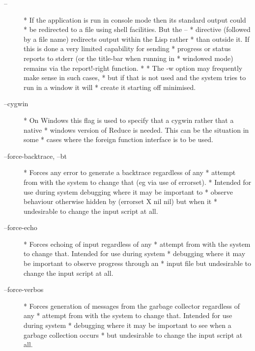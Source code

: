 \documentclass[a4paper,11pt]{article}
\begin{document}
\begin{description}

\item [{\ttfamily --}] \index{{\ttfamily --}}
          * If the application is run in console mode then its standard output could
          * be redirected to a file using shell facilities. But the {\ttfamily --}
          * directive (followed by a file name) redirects output within the Lisp rather
          * than outside it. If this is done a very limited capability for sending
          * progress or status reports to stderr (or the title-bar when running in
          * windowed  mode) remains via the {\ttfamily report!-right} function.
          *
          * The {\ttfamily -w} option may frequently make sense in such cases,
          * but if that is not used and the system tries to run in a window it will
          * create it starting off minimised.

\item [{\ttfamily --cygwin}] 
          * On Windows this flag is used to specify that a cygwin rather that a native
          * windows version of Reduce is needed. This can be the situation in some
          * cases where the foreign function interface is to be used.

\item [{\ttfamily --force-backtrace, --bt}] 
          * Forces any error to generate a backtrace regardless of any
          * attempt from with the system to change that (eg via use of errorset).
          * Intended for use during system  debugging where it may be important to
          * observe behaviour otherwise hidden by (errorset X nil nil) but when it
          * undesirable to change the input script at all.

\item [{\ttfamily --force-echo}] 
          * Forces echoing of input regardless of any
          * attempt from with the system to change that. Intended for use during system
          * debugging where it may be important to observe progress through an
          * input file but undesirable to change the input script at all.

\item [{\ttfamily --force-verbos}] 
          * Forces generation of messages from the garbage collector regardless of any
          * attempt from with the system to change that. Intended for use during system
          * debugging where it may be important to see when a garbage collection occurs
          * but undesirable to change the input script at all.


\end{description}
\end{document}
